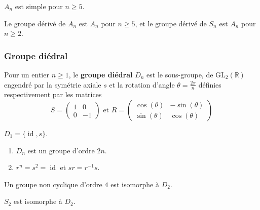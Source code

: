 	\begin{theorem}
		$A_n$ est simple pour $n \geq 5$.
	\end{theorem}

	\begin{corollary}
		Le groupe dérivé de $A_n$ est $A_n$ pour $n \geq 5$, et le groupe dérivé de $S_n$ est $A_n$ pour $n \geq 2$.
	\end{corollary}

	\subsubsection{Groupe diédral}


	\begin{definition}
		Pour un entier $n \geq 1$, le \textbf{groupe diédral} $D_n$ est le sous-groupe, de $\mathrm{GL}_2(\mathbb{R})$ engendré par la symétrie axiale $s$ et la rotation d'angle $\theta = \frac{2\pi}{n}$ définies respectivement par les matrices
		\[
		S =
		\begin{pmatrix}
			1 & 0 \\
			0 & -1
		\end{pmatrix}
		\text{ et }
		R =
		\begin{pmatrix}
			\cos(\theta) & -\sin(\theta) \\
			\sin(\theta) & \cos(\theta)
		\end{pmatrix}
		\]
	\end{definition}

	\begin{example}
		$D_1 = \{ \operatorname{id}, s \}$.
	\end{example}

	\begin{proposition}
		\begin{enumerate}[label=(\roman*)]
			\item $D_n$ est un groupe d'ordre $2n$.
			\item $r^n = s^2 = \operatorname{id}$ et $sr = r^{-1}s$.
		\end{enumerate}
	\end{proposition}

	\reference{28}

	\begin{proposition}
		Un groupe non cyclique d'ordre $4$ est isomorphe à $D_2$.
	\end{proposition}


	\begin{example}
		$S_2$ est isomorphe à $D_2$.
	\end{example}

